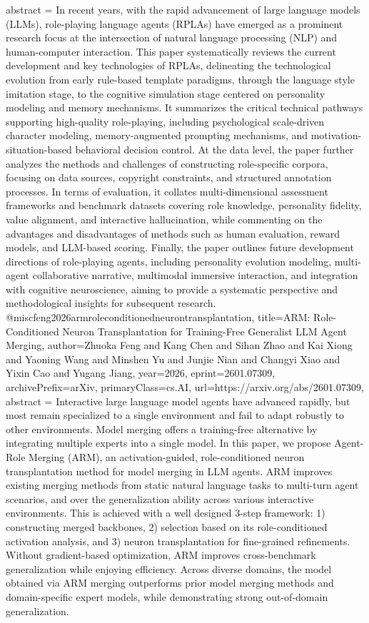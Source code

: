 {      abstract = {In recent years, with the rapid advancement of large language models (LLMs), role-playing language agents (RPLAs) have emerged as a prominent research focus at the intersection of natural language processing (NLP) and human-computer interaction. This paper systematically reviews the current development and key technologies of RPLAs, delineating the technological evolution from early rule-based template paradigms, through the language style imitation stage, to the cognitive simulation stage centered on personality modeling and memory mechanisms. It summarizes the critical technical pathways supporting high-quality role-playing, including psychological scale-driven character modeling, memory-augmented prompting mechanisms, and motivation-situation-based behavioral decision control. At the data level, the paper further analyzes the methods and challenges of constructing role-specific corpora, focusing on data sources, copyright constraints, and structured annotation processes. In terms of evaluation, it collates multi-dimensional assessment frameworks and benchmark datasets covering role knowledge, personality fidelity, value alignment, and interactive hallucination, while commenting on the advantages and disadvantages of methods such as human evaluation, reward models, and LLM-based scoring. Finally, the paper outlines future development directions of role-playing agents, including personality evolution modeling, multi-agent collaborative narrative, multimodal immersive interaction, and integration with cognitive neuroscience, aiming to provide a systematic perspective and methodological insights for subsequent research.}
}@misc{feng2026armroleconditionedneurontransplantation,
      title={ARM: Role-Conditioned Neuron Transplantation for Training-Free Generalist LLM Agent Merging}, 
      author={Zhuoka Feng and Kang Chen and Sihan Zhao and Kai Xiong and Yaoning Wang and Minshen Yu and Junjie Nian and Changyi Xiao and Yixin Cao and Yugang Jiang},
      year={2026},
      eprint={2601.07309},
      archivePrefix={arXiv},
      primaryClass={cs.AI},
      url={https://arxiv.org/abs/2601.07309},
      abstract = {Interactive large language model agents have advanced rapidly, but most remain specialized to a single environment and fail to adapt robustly to other environments. Model merging offers a training-free alternative by integrating multiple experts into a single model. In this paper, we propose Agent-Role Merging (ARM), an activation-guided, role-conditioned neuron transplantation method for model merging in LLM agents. ARM improves existing merging methods from static natural language tasks to multi-turn agent scenarios, and over the generalization ability across various interactive environments. This is achieved with a well designed 3-step framework: 1) constructing merged backbones, 2) selection based on its role-conditioned activation analysis, and 3) neuron transplantation for fine-grained refinements. Without gradient-based optimization, ARM improves cross-benchmark generalization while enjoying efficiency. Across diverse domains, the model obtained via ARM merging outperforms prior model merging methods and domain-specific expert models, while demonstrating strong out-of-domain generalization.}
}
